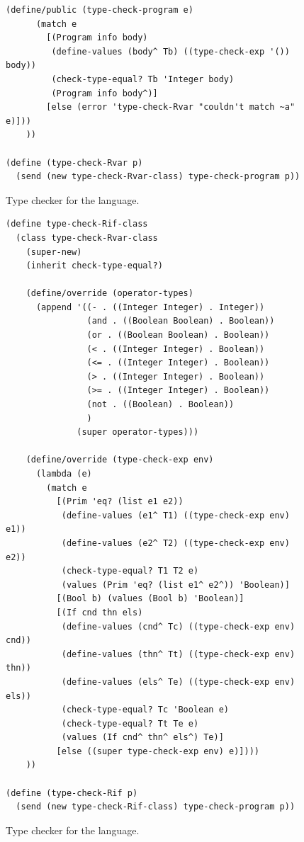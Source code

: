 \documentclass[11pt]{book}
\begin{document}
{\begin{figure}[tbp]
\begin{lstlisting}[basicstyle=\ttfamily\footnotesize]
    (define/public (type-check-program e)
      (match e
        [(Program info body)
         (define-values (body^ Tb) ((type-check-exp '()) body))
         (check-type-equal? Tb 'Integer body)
         (Program info body^)]
        [else (error 'type-check-Rvar "couldn't match ~a" e)]))
    ))

(define (type-check-Rvar p)
  (send (new type-check-Rvar-class) type-check-program p))
\end{lstlisting}
\caption{Type checker for the \LangVar{} language.}
\label{fig:type-check-Rvar}
\end{figure}

\begin{figure}[tbp]
\begin{lstlisting}[basicstyle=\ttfamily\footnotesize]
(define type-check-Rif-class
  (class type-check-Rvar-class
    (super-new)
    (inherit check-type-equal?)
    
    (define/override (operator-types)
      (append '((- . ((Integer Integer) . Integer))
                (and . ((Boolean Boolean) . Boolean))
                (or . ((Boolean Boolean) . Boolean))
                (< . ((Integer Integer) . Boolean))
                (<= . ((Integer Integer) . Boolean))
                (> . ((Integer Integer) . Boolean))
                (>= . ((Integer Integer) . Boolean))
                (not . ((Boolean) . Boolean))
                )
              (super operator-types)))

    (define/override (type-check-exp env)
      (lambda (e)
        (match e
          [(Prim 'eq? (list e1 e2))
           (define-values (e1^ T1) ((type-check-exp env) e1))
           (define-values (e2^ T2) ((type-check-exp env) e2))
           (check-type-equal? T1 T2 e)
           (values (Prim 'eq? (list e1^ e2^)) 'Boolean)]
          [(Bool b) (values (Bool b) 'Boolean)]
          [(If cnd thn els)
           (define-values (cnd^ Tc) ((type-check-exp env) cnd))
           (define-values (thn^ Tt) ((type-check-exp env) thn))
           (define-values (els^ Te) ((type-check-exp env) els))
           (check-type-equal? Tc 'Boolean e)
           (check-type-equal? Tt Te e)
           (values (If cnd^ thn^ els^) Te)]
          [else ((super type-check-exp env) e)])))
    ))

(define (type-check-Rif p)
  (send (new type-check-Rif-class) type-check-program p))
\end{lstlisting}
\caption{Type checker for the \LangIf{} language.}
\label{fig:type-check-Rif}
\end{figure}

}
\end{document}
